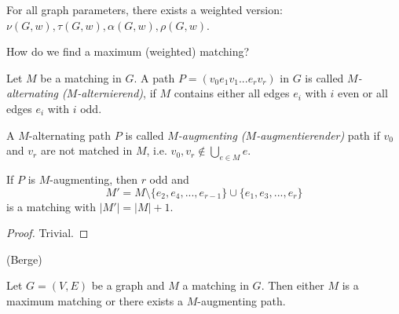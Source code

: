For all graph parameters, there exists a weighted version:
$\nu(G, w), \tau(G, w), \alpha(G, w), \rho(G, w)$.

\begin{qstn}
How do we find a maximum (weighted) matching?
\end{qstn}

\begin{defn} %
Let $M$ be a matching in $G$. A path $P = (v_0 e_1 v_1 ... e_r v_r)$ in $G$
is called \emph{$M$-alternating ($M$-alternierend)}, if $M$ contains either
all edges $e_i$ with $i$ even or all edges $e_i$ with $i$ odd.

A $M$-alternating path $P$ is called \emph{$M$-augmenting ($M$-augmentierender)} path if $v_0$ and
$v_r$ are not matched in $M$, i.e. $v_0, v_r \not\in \bigcup_{e \in M} e$.
\end{defn}

\begin{lem} %
If $P$ is $M$-augmenting, then $r$ odd and
\[
	M' = M \setminus \{ e_2, e_4, ..., e_{r-1} \} \cup \{ e_1, e_3, ..., e_r \}
\]
is a matching with $|M'| = |M| + 1$.
\end{lem}
\begin{proof}
Trivial.
\end{proof}

\begin{lem} %
(Berge)

Let $G = (V, E)$ be a graph and $M$ a matching in $G$.
Then either $M$ is a maximum matching or there exists a $M$-augmenting path.
\end{lem}
